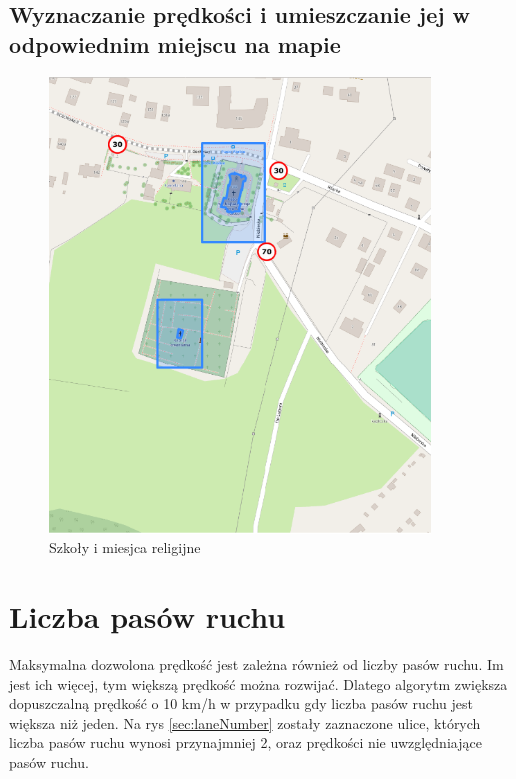 \newpage
\subsection{Wyznaczanie prędkości i umieszczanie jej w odpowiednim miejscu na mapie}

\begin{figure}[h]
\caption{Szkoły i miesjca religijne}
\label{sec:shopsSpeed}
\centering
\includegraphics[width=0.9\textwidth]{shopsSpeed}
\end{figure}
\newpage
\section{Liczba pasów ruchu}

Maksymalna dozwolona prędkość jest zależna również od liczby pasów ruchu. Im jest ich więcej, tym większą prędkość można rozwijać. Dlatego algorytm zwiększa dopuszczalną prędkość o 10 km/h w przypadku gdy liczba pasów ruchu jest większa niż jeden. Na rys \ref{sec:laneNumber} zostały zaznaczone ulice, których liczba pasów ruchu wynosi przynajmniej 2, oraz prędkości nie uwzględniające pasów ruchu. 

